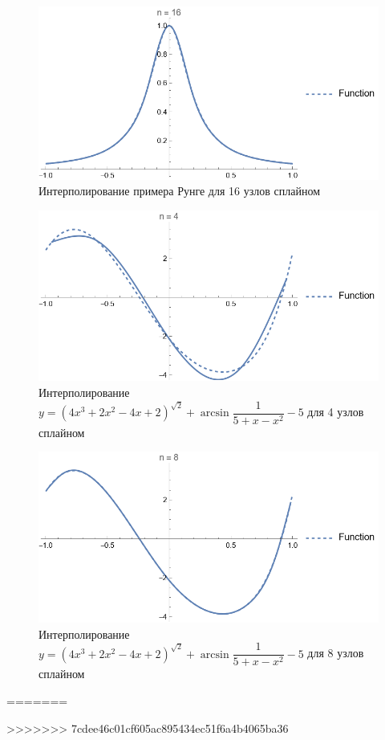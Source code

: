 \documentclass{article}
\begin{document}
    \begin{figure}[H]
        \includegraphics[width=\textwidth]{splinerunge16.png}
        \caption{{Интерполирование примера Рунге для 16 узлов сплайном}}
    \end{figure}
    \begin{figure}[H]
        \includegraphics[width=\textwidth]{splinetest4.png}
        \caption{{Интерполирование $y = (4x^3 + 2x^2 - 4x + 2 )^{\sqrt{2}} + \arcsin{\dfrac{1}{5+x - x^2}} - 5$ для 4 узлов сплайном}}
    \end{figure}
    \begin{figure}[H]
        \includegraphics[width=\textwidth]{splinetest8.png}
        \caption{{Интерполирование $y = (4x^3 + 2x^2 - 4x + 2 )^{\sqrt{2}} + \arcsin{\dfrac{1}{5+x - x^2}} - 5$ для 8 узлов сплайном}}
    \end{figure}

=======
    
>>>>>>> 7cdee46c01cf605ac895434ec51f6a4b4065ba36
\end{document}
